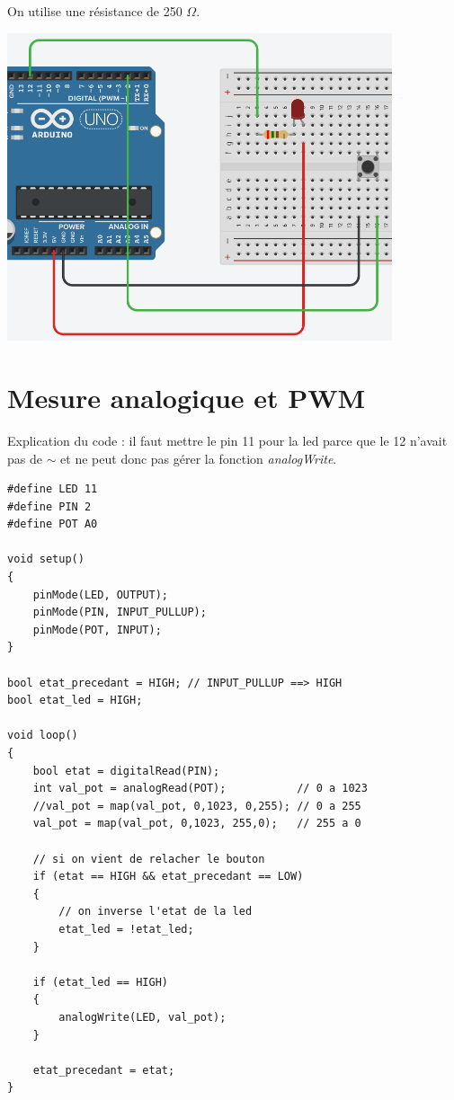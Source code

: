 \documentclass[a4paper]{article}
\begin{document}
On utilise une résistance de 250 $ \Omega $.

\begin{center}
    \includegraphics[width=0.85\textwidth]{images/labo1-manip3.PNG}
\end{center}










\section{Mesure analogique et PWM}





Explication du code : il faut mettre le pin 11 pour la led parce que le 12 n'avait pas de $ \sim $ et ne peut donc pas gérer la fonction \textit{analogWrite}.

\begin{lstlisting}[frame=single]
#define LED 11
#define PIN 2
#define POT A0

void setup()
{
    pinMode(LED, OUTPUT);
    pinMode(PIN, INPUT_PULLUP);
    pinMode(POT, INPUT);
}

bool etat_precedant = HIGH; // INPUT_PULLUP ==> HIGH
bool etat_led = HIGH;

void loop()
{
    bool etat = digitalRead(PIN);
    int val_pot = analogRead(POT);           // 0 a 1023
    //val_pot = map(val_pot, 0,1023, 0,255); // 0 a 255
    val_pot = map(val_pot, 0,1023, 255,0);   // 255 a 0

    // si on vient de relacher le bouton
    if (etat == HIGH && etat_precedant == LOW)
    {
        // on inverse l'etat de la led
        etat_led = !etat_led;
    }
    
    if (etat_led == HIGH)
    {
        analogWrite(LED, val_pot);
    }
    
    etat_precedant = etat;
}
\end{lstlisting}
\end{document}
